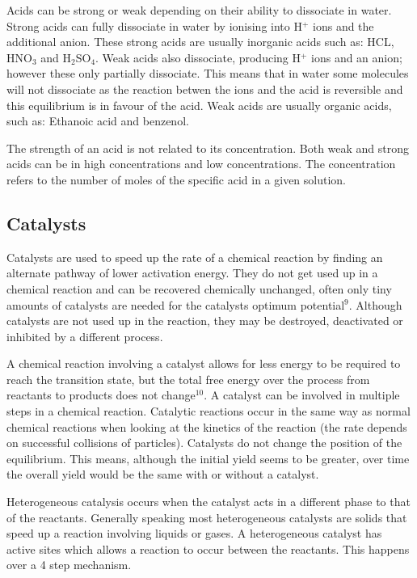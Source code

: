 Acids can be strong or weak depending on their ability to dissociate in water. Strong acids can fully dissociate in water by ionising into H$^+$ ions and the additional anion. These strong acids are usually inorganic acids such as: HCL, HNO$_3$ and H$_2$SO$_4$. Weak acids also dissociate, producing H$^+$ ions and an anion; however these only partially dissociate. This means that in water some molecules will not dissociate as the reaction betwen the ions and the acid is reversible and this equilibrium is in favour of the acid. Weak acids are usually organic acids, such as: Ethanoic acid and benzenol. 

The strength of an acid is not related to its concentration. Both weak and strong acids can be in high concentrations and low concentrations. The concentration refers to the number of moles of the specific acid in a given solution.



	\subsection{Catalysts} \label{catalysts}

Catalysts are used to speed up the rate of a chemical reaction by finding an alternate pathway of lower activation energy. They do not get used up in a chemical reaction and can be recovered chemically unchanged, often only tiny amounts of catalysts are needed for the catalysts optimum potential$^9$. Although catalysts are not used up in the reaction, they may be destroyed, deactivated or inhibited by a different process. 

A chemical reaction involving a catalyst allows for less energy to be required to reach the transition state, but the total free energy over the process from reactants to products does not change$^{10}$. A catalyst can be involved in multiple steps in a chemical reaction. Catalytic reactions occur in the same way as normal chemical reactions when looking at the kinetics of the reaction (the rate depends on successful collisions of particles). Catalysts do not change the position of the equilibrium. This means, although the initial yield seems to be greater, over time the overall yield would be the same with or without a catalyst. 

Heterogeneous catalysis occurs when the catalyst acts in a different phase to that of the reactants. Generally speaking most heterogeneous catalysts are solids that speed up a reaction involving liquids or gases. A heterogeneous catalyst has active sites which allows a reaction to occur between the reactants. This happens over a 4 step mechanism.

